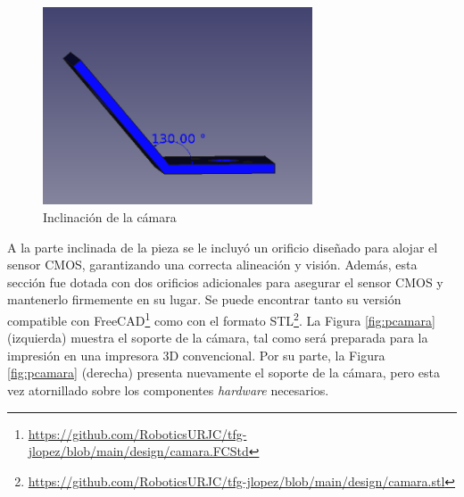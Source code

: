 \begin{figure} [h!]
	\begin{center}
		\includegraphics[width=8cm]{figs/cap5/rot.png}
	\end{center}
	\caption{Inclinación de la cámara} 
\label{fig:rot}
\end{figure}

A la parte inclinada de la pieza se le incluyó un orificio diseñado para alojar el sensor CMOS, garantizando una correcta alineación y visión. Además, esta sección fue dotada con dos orificios adicionales para asegurar el sensor CMOS y mantenerlo firmemente en su lugar. Se puede encontrar tanto su versión compatible con FreeCAD\footnote{\url{https://github.com/RoboticsURJC/tfg-jlopez/blob/main/design/camara.FCStd}} como con el formato STL\footnote{\url{https://github.com/RoboticsURJC/tfg-jlopez/blob/main/design/camara.stl}}. La Figura \ref{fig:pcamara} (izquierda) muestra el soporte de la cámara, tal como será preparada para la impresión en una impresora 3D convencional. Por su parte, la Figura \ref{fig:pcamara} (derecha) presenta nuevamente el soporte de la cámara, pero esta vez atornillado sobre los componentes \textit{hardware} necesarios. 

